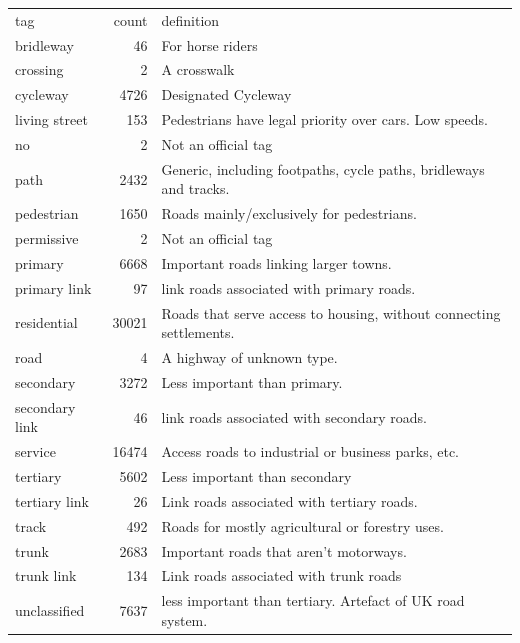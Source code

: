 \documentclass[11pt]{article} %
\begin{document}
\begin{tabular}{lrl}
tag & count & definition \\
bridleway& 46 & For horse riders\\
crossing & 2 & A crosswalk \\
cycleway & 4726 & Designated Cycleway\\
living street & 153 & Pedestrians have legal priority over cars. Low speeds.\\
no & 2 & Not an official tag \\
path & 2432 & Generic, including footpaths, cycle paths, bridleways and tracks. \\
pedestrian & 1650 & Roads mainly/exclusively for pedestrians.\\
permissive & 2 & Not an official tag\\
primary & 6668 & Important roads linking larger towns.\\
primary link & 97 & link roads associated with primary roads.\\
residential & 30021 & Roads that serve access to housing, without connecting settlements.\\
 road & 4 & A highway of unknown type. \\
secondary & 3272 & Less important than primary.\\
secondary link & 46 & link roads associated with secondary roads.\\
service & 16474 & Access roads to industrial or business parks, etc. \\
tertiary & 5602 & Less important than secondary\\
tertiary link & 26 & Link roads associated with tertiary roads. \\ 
track & 492 & Roads for mostly agricultural or forestry uses. \\
trunk & 2683 & Important roads that aren't motorways. \\
trunk link & 134 & Link roads associated with trunk roads \\
unclassified & 7637 & less important than tertiary. Artefact of UK road system.\\ 
\end{tabular}
\end{document}
